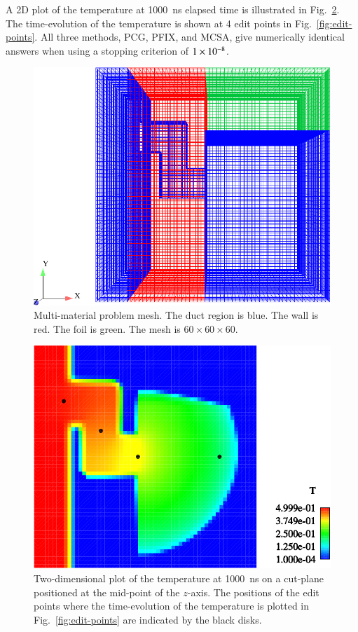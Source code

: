 \documentclass[preprint,12pt]{elsarticle}
\begin{document}
A 2D plot of the temperature at 1000~ns elapsed time is illustrated in
Fig.~\ref{fig:multi-mat_T}.  The time-evolution of the temperature is shown at
4 edit points in Fig.~\ref{fig:edit-points}.  All three methods, PCG, PFIX,
and MCSA, give numerically identical answers when using a stopping criterion
of $1\times 10^{-8}$.
\begin{figure}[h!]
  \centerline{ \includegraphics[width=5in,clip]{mesh.pdf}}
  \caption{Multi-material problem mesh.  The duct region is blue.  The
    wall is red.  The foil is green.  The mesh is $60\times 60\times
    60$.}
  \label{fig:multi-mat-mesh}
\end{figure}

\begin{figure}[h!]
  \centerline{ \includegraphics[width=5in,clip]{T_multi_mat.pdf}}
  \caption{ Two-dimensional plot of the temperature at 1000~ns on a
    cut-plane positioned at the mid-point of the $z$-axis.  The
    positions of the edit points where the time-evolution of the
    temperature is plotted in Fig.~\ref{fig:edit-points} are indicated
    by the black disks.}
  \label{fig:multi-mat_T}
\end{figure}
\end{document}
